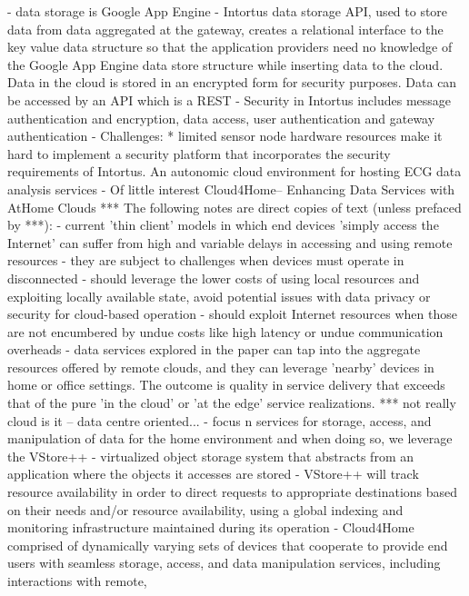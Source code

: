 				- data storage is Google App Engine
				- Intortus data storage API, used to store data from data aggregated at the gateway, creates a relational interface to the key value data structure so that the application providers need no knowledge of the Google App Engine data store structure while inserting data to the cloud. Data in the cloud is stored in an encrypted form for security purposes. Data can be accessed by an API which is a REST
				- Security in Intortus includes message authentication and encryption, data access, user authentication and gateway authentication
				- Challenges:
					* limited sensor node hardware resources make it hard to implement a security platform that incorporates the security requirements of Intortus.
			An autonomic cloud environment for hosting ECG data analysis services
				- Of little interest
			Cloud4Home-- Enhancing Data Services with AtHome Clouds
				*** The following notes are direct copies of text (unless prefaced by ***):
				- current 'thin client' models in which end devices 'simply access the Internet' can suffer from high and variable delays in accessing and using remote resources
				- they are subject to challenges when devices must operate in disconnected
				- should leverage the lower costs of using local resources and exploiting locally available state, avoid potential issues with data privacy or security for cloud-based operation
				- should exploit Internet resources when those are not encumbered by undue costs like high latency or undue communication overheads
				- data services explored in the paper can tap into the aggregate resources offered by remote clouds, and they can leverage 'nearby' devices in home or office settings. The outcome is quality in service delivery that exceeds that of the pure 'in the cloud' or 'at the edge' service realizations.
				*** not really cloud is it -- data centre oriented...
				- focus n services for storage, access, and manipulation of data for the home environment and when doing so, we leverage the VStore++
					- virtualized object storage system that abstracts from an application where the objects it accesses are stored
					- VStore++ will track resource availability in order to direct requests to appropriate destinations
based on their needs and/or resource availability, using a global indexing and monitoring infrastructure maintained
during its operation
					- Cloud4Home comprised of dynamically varying sets of devices that cooperate to provide end users with seamless storage, access, and data manipulation services, including interactions with remote,
